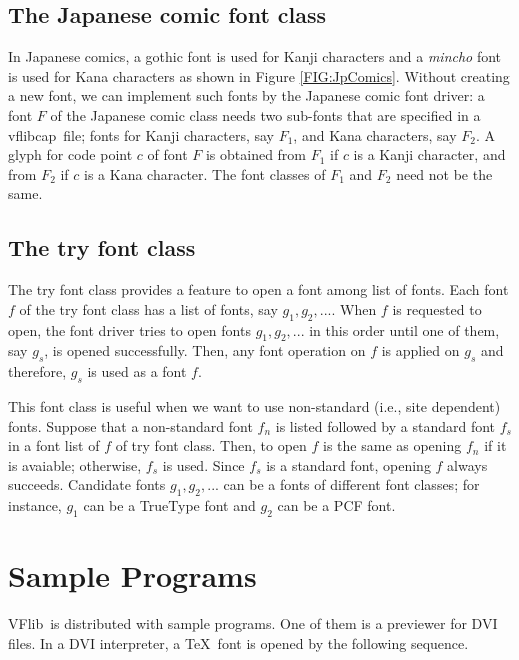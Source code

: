 \documentclass{cah-gut}
\newcommand{\pkg}[1]{\textsf{#1}}
\newcommand{\VFlib}{\pkg{VFlib}}
\newcommand{\vflibcap}{\pkg{vflibcap}}
\begin{document}
\subsection{The Japanese comic font class}

In Japanese comics, a gothic font is used for Kanji
characters and a {\it mincho} font is used for Kana
characters as shown in Figure \ref{FIG:JpComics}.  
Without creating a new font, we can implement such fonts by 
the  Japanese comic font driver: 
a font $F$ of the Japanese comic class needs two sub-fonts that are
specified in a \vflibcap\ file; fonts for Kanji characters, say $F_1$,
and Kana characters, say $F_2$.  
A glyph for code point $c$ of font $F$ is obtained from $F_1$ if $c$ 
is a Kanji character, and from $F_2$ if $c$ is a Kana character.  
The font classes of $F_1$ and $F_2$ need not be the same.


\subsection{The try font class}

The try font class provides a feature to open a font among list of fonts.
Each font $f$ of the try font class has a list of fonts, say $g_1, g_2, ...$.
When $f$ is requested to open, the font driver tries to open fonts
$g_1, g_2, ...$ in this order until one of them, 
say $g_s$, is opened successfully.
Then, any font operation on $f$ is applied on $g_s$ and 
therefore, $g_s$ is used as a font $f$.

This font class is useful when we want to use non-standard 
(i.e., site dependent) fonts.
Suppose that a non-standard font $f_n$ is listed followed by
a standard font $f_s$ in a font list of $f$ of try font class.
Then, to open $f$ is the same as opening $f_n$ if it is avaiable; 
otherwise, $f_s$ is used.
Since $f_s$ is a standard font, opening $f$ always succeeds.
Candidate fonts $g_1, g_2, ...$ can be a fonts of different font classes;
for instance, $g_1$ can be a TrueType font and $g_2$ can be a PCF font. 




\section{Sample Programs}
\label{SEC:SamplePrograms}

\VFlib\ is distributed with sample programs.  
One of them is a previewer for DVI files.  
In a DVI interpreter, a \TeX\ font is opened
by the following sequence.
\end{document}
